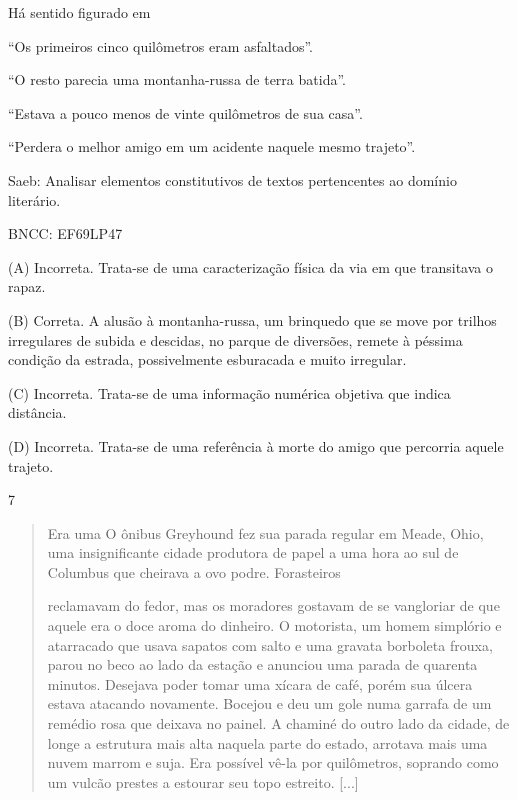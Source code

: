 
Há sentido figurado em

\begin{escolha}
\item ``Os primeiros cinco quilômetros eram asfaltados''.

\item ``O resto parecia uma montanha-russa de terra batida''.

\item ``Estava a pouco menos de vinte quilômetros de sua casa''.

\item ``Perdera o melhor amigo em um acidente naquele mesmo trajeto''.
\end{escolha}

Saeb: Analisar elementos constitutivos de textos pertencentes ao domínio
literário.

BNCC: EF69LP47

(A) Incorreta. Trata-se de uma caracterização física da via em que
transitava o rapaz.

(B) Correta. A alusão à montanha-russa, um brinquedo que se move por
trilhos irregulares de subida e descidas, no parque de diversões, remete
à péssima condição da estrada, possivelmente esburacada e muito
irregular.

(C) Incorreta. Trata-se de uma informação numérica objetiva que indica
distância.

(D) Incorreta. Trata-se de uma referência à morte do amigo que percorria
aquele trajeto.

\num{7}

\begin{quote}
Era uma O ônibus Greyhound fez sua parada regular em Meade, Ohio, uma
insignificante cidade produtora de papel a uma hora ao sul de Columbus
que cheirava a ovo podre. Forasteiros

reclamavam do fedor, mas os moradores gostavam de se vangloriar de que
aquele era o doce aroma do dinheiro. O motorista, um homem simplório e
atarracado que usava sapatos com salto e uma gravata borboleta frouxa,
parou no beco ao lado da estação e anunciou uma parada de quarenta
minutos. Desejava poder tomar uma xícara de café, porém sua úlcera
estava atacando novamente. Bocejou e deu um gole numa garrafa de um
remédio rosa que deixava no painel. A chaminé do outro lado da cidade,
de longe a estrutura mais alta naquela parte do estado, arrotava mais
uma nuvem marrom e suja. Era possível vê-la por quilômetros, soprando
como um vulcão prestes a estourar seu topo estreito.
{[}...{]}
\end{quote}

